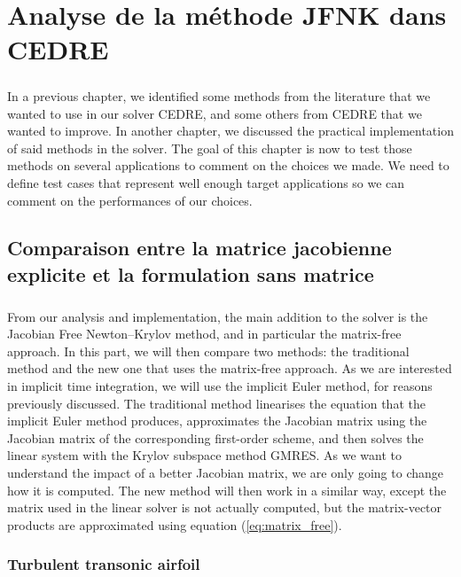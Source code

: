 \chapter{Analyse de la méthode JFNK dans CEDRE}

  \paragraph{}
  In a previous chapter, we identified some methods from the literature that we wanted to use in our solver CEDRE, and some others from CEDRE that we wanted to improve.
  In another chapter, we discussed the practical implementation of said methods in the solver.
  The goal of this chapter is now to test those methods on several applications to comment on the choices we made.
  We need to define test cases that represent well enough target applications so we can comment on the performances of our choices.


  \section{Comparaison entre la matrice jacobienne explicite et la formulation sans matrice}

    \paragraph{}
    From our analysis and implementation, the main addition to the solver is the Jacobian Free Newton--Krylov method, and in particular the matrix-free approach.
    In this part, we will then compare two methods: the traditional method and the new one that uses the matrix-free approach.
    As we are interested in implicit time integration, we will use the implicit Euler method, for reasons previously discussed.
    The traditional method linearises the equation that the implicit Euler method produces, approximates the Jacobian matrix using the Jacobian matrix of the corresponding first-order scheme, and then solves the linear system with the Krylov subspace method GMRES.
    As we want to understand the impact of a better Jacobian matrix, we are only going to change how it is computed.
    The new method will then work in a similar way, except the matrix used in the linear solver is not actually computed, but the matrix-vector products are approximated using equation (\ref{eq:matrix_free}).


    \subsection{Turbulent transonic airfoil}

